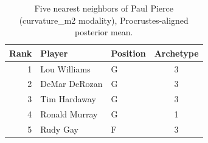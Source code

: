 \begin{table}[htbp]
  \centering\small
  \begin{tabular}{rllc}
    \toprule
    Rank & Player & Position & Archetype \\
    \midrule
    1 & Lou Williams & G & 3 \\
    2 & DeMar DeRozan & G & 3 \\
    3 & Tim Hardaway & G & 3 \\
    4 & Ronald Murray & G & 1 \\
    5 & Rudy Gay & F & 3 \\
    \bottomrule
  \end{tabular}
  \caption{Five nearest neighbors of Paul Pierce (curvature_m2 modality), Procrustes-aligned posterior mean.}
  \label{tab:Paul_Pierce_neighbors_curvature_m2}
\end{table}

